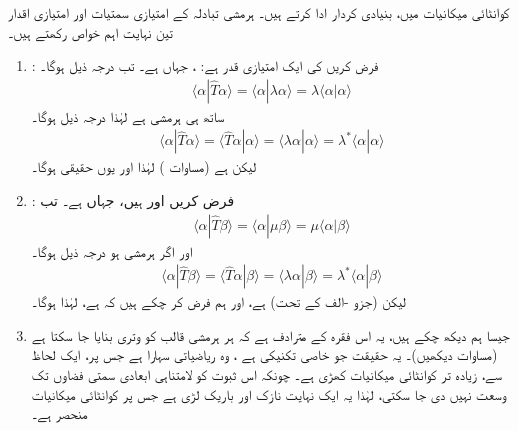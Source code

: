 کوانٹائی میکانیات میں،  
    بنیادی کردار ادا کرتے ہیں۔ ہرمشی تبادلہ کے امتیازی سمتیات اور امتیازی اقدار تین نہایت اہم خواص رکھتے ہیں۔
\begin{enumerate}[a]
\item
{}

: فرض کریں  کی ایک امتیازی قدر  ہے:   ، جہاں  ہے۔ تب درجہ ذیل ہوگا۔
\begin{align*}
	\langle\alpha|\hat{T}\alpha\rangle = \langle\alpha|\lambda\alpha\rangle = \lambda\langle\alpha|\alpha\rangle
\end{align*}
ساتھ ہی  ہرمشی ہے لہٰذا درجہ ذیل ہوگا۔
\begin{align*}
	\langle\alpha|\hat{T}\alpha\rangle = \langle\hat{T}\alpha|\alpha\rangle = \langle\lambda\alpha|\alpha\rangle = \lambda^*\langle\alpha|\alpha\rangle
\end{align*}
لیکن  ہے  (مساوات )  لہٰذا  اور یوں  حقیقی ہوگا۔
\item
{}

: فرض کریں  اور  ہیں،  جہاں  ہے۔ تب
\begin{align*}
	\langle\alpha|\hat{T}\beta\rangle = \langle\alpha|\mu\beta\rangle = \mu\langle\alpha|\beta\rangle
\end{align*}
اور اگر  ہرمشی ہو درجہ ذیل ہوگا۔
\begin{align*}
	\langle\alpha|\hat{T}\beta\rangle = \langle\hat{T}\alpha|\beta\rangle = \langle\lambda\alpha|\beta\rangle = \lambda^*\langle\alpha|\beta\rangle
\end{align*}
لیکن   (جزو -الف کے تحت)   ہے،   اور ہم فرض کر چکے ہیں کہ  ہے،  لہٰذا  ہوگا۔
\item
{}

 جیسا ہم دیکھ چکے ہیں،  یہ اس فقرہ  کے مترادف ہے کہ ہر  ہرمشی قالب کو وتری بنایا جا سکتا ہے (مساوات   دیکھیں)۔ یہ    حقیقت جو خاصی تکنیکی ہے ،   وہ ریاضیاتی سہارا ہے جس پر، ایک لحاظ سے،  زیادہ تر کوانٹائی میکانیات کھڑی ہے۔ چونکہ اس ثبوت کو لامتناہی ابعادی سمتی فضاوں تک وسعت نہیں دی جا سکتی،  لہٰذا یہ ایک نہایت نازک اور  باریک لڑی ہے جس پر کوانٹائی میکانیات منحصر ہے۔
\end{enumerate}
